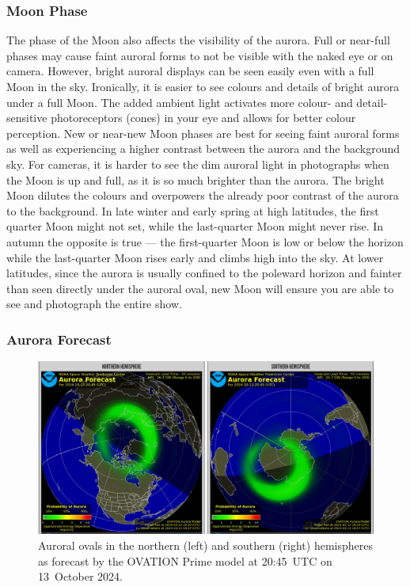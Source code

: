 \documentclass{article}
\renewcommand{\cite}[1]{\parencite{#1}}
\begin{document}
\subsubsection{Moon Phase}
The phase of the Moon also affects the visibility of the aurora. Full or near-full phases may cause faint auroral forms to not be visible with the naked eye or on camera. However, bright auroral displays can be seen easily even with a full Moon in the sky. Ironically, it is easier to see colours and details of bright aurora under a full Moon. The added ambient light activates more colour- and detail-sensitive photoreceptors (cones) in your eye and allows for better colour perception. New or near-new Moon phases are best for seeing faint auroral forms as well as experiencing a higher contrast between the aurora and the background sky. For cameras, it is harder to see the dim auroral light in photographs when the Moon is up and full, as it is so much brighter than the aurora. The bright Moon dilutes the colours and overpowers the already poor contrast of the aurora to the background. In late winter and early spring at high latitudes, the first quarter Moon might not set, while the last-quarter Moon might never rise. In autumn the opposite is true — the first-quarter Moon is low or below the horizon while the last-quarter Moon rises early and climbs high into the sky. At lower latitudes, since the aurora is usually confined to the poleward horizon and fainter than seen directly under the auroral oval, new Moon will ensure you are able to see and photograph the entire show.

\subsubsection{Aurora Forecast}

\begin{figure}
  \includegraphics[width=\linewidth]{Fig5_auroralOvals_OvationPrime.png}
  \caption{Auroral ovals in the northern (left) and southern (right) hemispheres as forecast by the OVATION Prime model \cite{Machol2012} at 20:45~UTC on 13~October 2024.} 
  \label{fig-auroralovals}
\end{figure}
\end{document}
